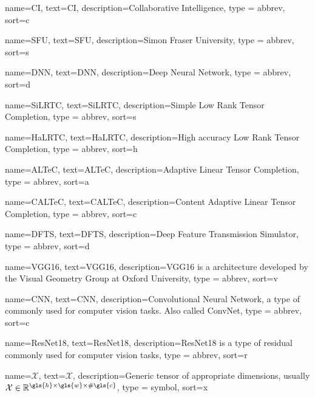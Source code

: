 

\makeglossaries

%
{%
	name={CI},
	text={CI},
	description={Collaborative Intelligence},
	type = {abbrev},
	sort={c}
}

%
{%
	name={SFU},
	text={SFU},
	description={Simon Fraser University},
	type = {abbrev},
	sort={s}
}

%
{%
	name={DNN},
	text={DNN},
	description={Deep Neural Network},
	type = {abbrev},
	sort={d}
}

%
{%
	name={SiLRTC},
	text={SiLRTC},
	description={Simple Low Rank Tensor Completion},
	type = {abbrev},
	sort={s}
}

%
{%
	name={HaLRTC},
	text={HaLRTC},
	description={High accuracy Low Rank Tensor Completion},
	type = {abbrev},
	sort={h}
}

%
{%
	name={ALTeC},
	text={ALTeC},
	description={Adaptive Linear Tensor Completion},
	type = {abbrev},
	sort={a}
}

%
{%
	name={CALTeC},
	text={CALTeC},
	description={Content Adaptive Linear Tensor Completion},
	type = {abbrev},
	sort={c}
}


%
{%
	name={DFTS},
	text={DFTS},
	description={Deep Feature Transmission Simulator},
	type = {abbrev},
	sort={d}
}

%
{%
	name={VGG16},
	text={VGG16},
	description={VGG16 is a  architecture developed by the Visual Geometry Group at Oxford University},
	type = {abbrev},
	sort={v}
}

%
{%
	name={CNN},
	text={CNN},
	description={Convolutional Neural Network, a type of  commonly used for computer vision tasks. Also called ConvNet},
	type = {abbrev},
	sort={c}
}


%
{%
	name={ResNet18},
	text={ResNet18},
	description={ResNet18 is a type of residual  commonly used for computer vision tasks},
	type = {abbrev},
	sort={r}
}

%
{%
	name={$\mathcal{X}$},
	text={\ensuremath{\mathcal{X}}},
	description={Generic tensor of appropriate dimensions, usually $\mathcal{X} \in \mathbb{R}^{\gls{h} \times \gls{w} \times \#\gls{c}}$},
	type = {symbol},
	sort={x}
}

